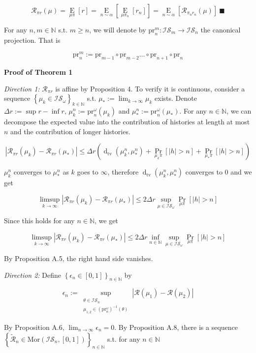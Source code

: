 \documentclass[a4paper]{article}
\newcommand{\Co}[1]{}
\newcommand{\AP}[1]{\left(#1\right)}
\newcommand{\AB}[1]{\left[#1\right]}
\newcommand{\AC}[1]{\left\{#1\right\}}
\newcommand{\Abs}[1]{\left\vert #1 \right\vert}
\newcommand{\Pa}[2]{\underset{#1}{\operatorname{Pr}}\AB{#2}}
\newcommand{\Ea}[2]{\underset{#1}{\operatorname{E}}\AB{#2}}
\newcommand{\Dtva}[1]{\operatorname{d}_{\text{tv}}\AP{#1}}
\newcommand{\Nats}{\mathbb{N}}
\newcommand{\Reals}{\mathbb{R}}
\newcommand{\Mor}{\mathrm{Mor}}
\newcommand{\Lim}[1]{\lim_{#1 \rightarrow \infty}}
\newcommand{\LimSup}[1]{\limsup_{#1 \rightarrow \infty}}
\newcommand{\A}{\mathcal{A}}
\newcommand{\Ob}{\mathcal{O}}
\newcommand{\AO}{\AP{\A\times\Ob}}
\newcommand{\FH}{\AO^*}
\newcommand{\R}{\mathcal{R}}
\newcommand{\IS}{\mathcal{IS}}
\newcommand{\Prj}{\mathrm{pr}}
\newcommand{\Prjo}{\mathrm{pr}^\omega_n}
\begin{document}
$$\R_{\pi r}(\mu)=\Ea{\mu\pi}{r}=\Ea{n\sim\alpha}{\Ea{\mu\pi_n}{r_n}}=\Ea{n\sim\alpha}{\R_{\pi_n r_n}(\mu)}\ \blacksquare$$

For any $n,m\in\Nats$ s.t. $m\geq n$, we will denote by $\Prj^{m}_n:\IS_m\rightarrow\IS_n$ the canonical projection. That is

$$\Prj^m_n:=\Prj_{m-1}\circ\Prj_{m-2}\ldots\circ\Prj_{n+1}\circ\Prj_n$$

\textbf{Proof of Theorem 1}\Co{b}

\textit{Direction 1:}\Co{i} $\R_{\pi r}$ is affine by Proposition 4. To verify it is continuous, consider a sequence $\AC{\mu_k\in\IS_\omega}_{k\in\Nats}$ s.t. $\mu_*:=\Lim{k}\mu_k$ exists. Denote $\Delta r:=\sup r - \inf r$, $\mu_k^n:=\Prjo\AP{\mu_k}$ and $\mu^n_*:=\Prjo\AP{\mu_*}$. For any $n\in\Nats$, we can decompose the expected value into the contribution of histories at length at most $n$ and the contribution of longer histories.

$$\Abs{\R_{\pi r}\AP{\mu_k}-\R_{\pi r}\AP{\mu_*}} \leq \Delta r\AP{\Dtva{\mu_k^n,\mu_*^n}+\Pa{\mu_k\pi}{\Abs{h}>n} +\Pa{\mu_*\pi}{\Abs{h}>n}}$$

$\mu_k^n$ converges to $\mu_*^n$ as $k$ goes to $\infty$, therefore $\Dtva{\mu_k^n,\mu_*^n}$ converges to 0 and we get

$$\LimSup{k}\Abs{\R_{\pi r}\AP{\mu_k}-\R_{\pi r}\AP{\mu_*}} \leq 2\Delta r\sup_{\mu\in\IS_\omega}\Pa{\mu\pi}{\Abs{h}>n}$$

Since this holds for any $n\in\Nats$, we get

$$\LimSup{k}\Abs{\R_{\pi r}\AP{\mu_k}-\R_{\pi r}\AP{\mu_*}} \leq 2\Delta r\inf_{n\in\Nats}\sup_{\mu\in\IS_\omega}\Pa{\mu\pi}{\Abs{h}>n}$$

By Proposition A.5, the right hand side vanishes.

\textit{Direction 2:}\Co{i} \Co{$\IS_\omega$ is compact and $\R$ is continuous, therefore $\R$ is bounded. Without loss of generality, assume that the image of $\R$ is contained in $[0,1]$ (otherwise we can redefine $\R$ by $\R':=a\R+b$ for suitable constants $a,b\in\Reals$ and apply the inverse transformation to the resulting $r':\FH\rightarrow[0,1]$). }Define $\AC{\epsilon_n\in[0,1]}_{n\in\Nats}$ by

$$\epsilon_n:=\sup_{\substack{\theta\in\IS_n\\\mu_{1,2}\in\AP{\Prjo}^{-1}(\theta)}}\Abs{\R\AP{\mu_1}-\R\AP{\mu_2}}$$

By Proposition A.6, $\Lim{n}\epsilon_n=0$. By Proposition A.8, there is a sequence $\AC{\tilde{\R}_n\in\Mor\AP{\IS_n,[0,1]}}_{n\in\Nats}$ s.t. for any $n\in\Nats$
\end{document}
